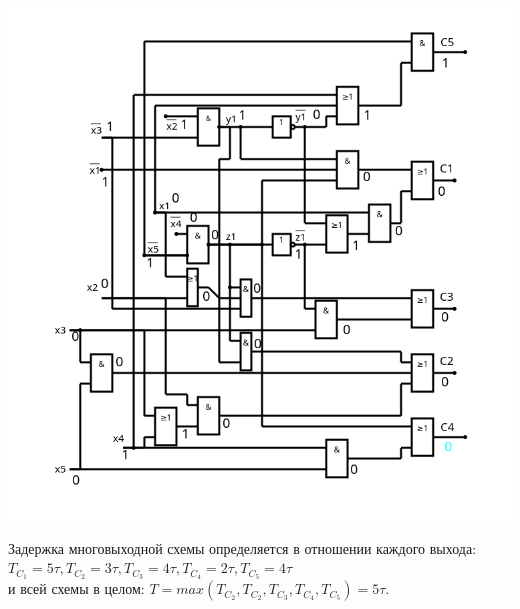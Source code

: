 \begin{center}
\includegraphics[width=\linewidth]{imgs/part2/circuit-C1-C5_boolean_basis.png}
\end{center}
Задержка многовыходной схемы определяется в отношении каждого выхода: $T_{C_1}=5\tau, T_{C_2}=3\tau, T_{C_3}=4\tau, T_{C_4}=2\tau, T_{C_5}=4\tau$ \\и всей схемы в целом: $T= max (T_{C_2}, T_{C_2}, T_{C_3}, T_{C_4}, T_{C_5})= 5\tau.$
